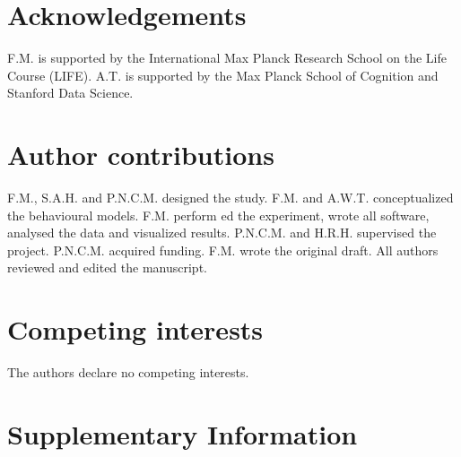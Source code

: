 \documentclass[11pt, a4paper]{article}
\begin{document}
\section*{Acknowledgements}
F.M. is supported by the International Max Planck Research School on the Life Course (LIFE). A.T. is supported by the Max Planck School of Cognition and Stanford Data Science.

\section*{Author contributions}
F.M., S.A.H. and P.N.C.M. designed the study. F.M. and A.W.T. conceptualized the behavioural models. F.M. perform ed the experiment, wrote all software, analysed the data and visualized results. P.N.C.M. and H.R.H. supervised the project. P.N.C.M. acquired funding. F.M. wrote the original draft. All authors reviewed and edited the manuscript.

\section*{Competing interests}
The authors declare no competing interests.

\renewcommand*{\bibfont}{\small}
\printbibliography
\newpage

\section*{Supplementary Information}
\label{sec:supplement}
\end{document}
